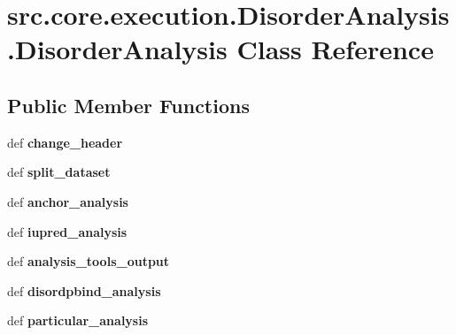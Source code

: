 \hypertarget{classsrc_1_1core_1_1execution_1_1DisorderAnalysis_1_1DisorderAnalysis}{\section{src.\-core.\-execution.\-Disorder\-Analysis.\-Disorder\-Analysis Class Reference}
\label{classsrc_1_1core_1_1execution_1_1DisorderAnalysis_1_1DisorderAnalysis}
}
\subsection*{Public Member Functions}
\begin{DoxyCompactItemize}
\item 
\hypertarget{classsrc_1_1core_1_1execution_1_1DisorderAnalysis_1_1DisorderAnalysis_a06547524f0853053afa867b43439b19a}{def {\bfseries change\-\_\-header}}\label{classsrc_1_1core_1_1execution_1_1DisorderAnalysis_1_1DisorderAnalysis_a06547524f0853053afa867b43439b19a}

\item 
\hypertarget{classsrc_1_1core_1_1execution_1_1DisorderAnalysis_1_1DisorderAnalysis_a922e091f1580ba686d0aa1f6ac62b34a}{def {\bfseries split\-\_\-dataset}}\label{classsrc_1_1core_1_1execution_1_1DisorderAnalysis_1_1DisorderAnalysis_a922e091f1580ba686d0aa1f6ac62b34a}

\item 
\hypertarget{classsrc_1_1core_1_1execution_1_1DisorderAnalysis_1_1DisorderAnalysis_a00e355ab6e99f45c43a07f91f9ad9360}{def {\bfseries anchor\-\_\-analysis}}\label{classsrc_1_1core_1_1execution_1_1DisorderAnalysis_1_1DisorderAnalysis_a00e355ab6e99f45c43a07f91f9ad9360}

\item 
\hypertarget{classsrc_1_1core_1_1execution_1_1DisorderAnalysis_1_1DisorderAnalysis_a1dfae98d95f41901c95faf52b797841e}{def {\bfseries iupred\-\_\-analysis}}\label{classsrc_1_1core_1_1execution_1_1DisorderAnalysis_1_1DisorderAnalysis_a1dfae98d95f41901c95faf52b797841e}

\item 
\hypertarget{classsrc_1_1core_1_1execution_1_1DisorderAnalysis_1_1DisorderAnalysis_a0456ea6250a3b9cb126dc04a385791df}{def {\bfseries analysis\-\_\-tools\-\_\-output}}\label{classsrc_1_1core_1_1execution_1_1DisorderAnalysis_1_1DisorderAnalysis_a0456ea6250a3b9cb126dc04a385791df}

\item 
\hypertarget{classsrc_1_1core_1_1execution_1_1DisorderAnalysis_1_1DisorderAnalysis_ad25eece82b9d869205cc4ca39f4fb930}{def {\bfseries disordpbind\-\_\-analysis}}\label{classsrc_1_1core_1_1execution_1_1DisorderAnalysis_1_1DisorderAnalysis_ad25eece82b9d869205cc4ca39f4fb930}

\item 
\hypertarget{classsrc_1_1core_1_1execution_1_1DisorderAnalysis_1_1DisorderAnalysis_a72fe1648d243781dd8ad73b204521fdc}{def {\bfseries particular\-\_\-analysis}}\label{classsrc_1_1core_1_1execution_1_1DisorderAnalysis_1_1DisorderAnalysis_a72fe1648d243781dd8ad73b204521fdc}

\end{DoxyCompactItemize}

